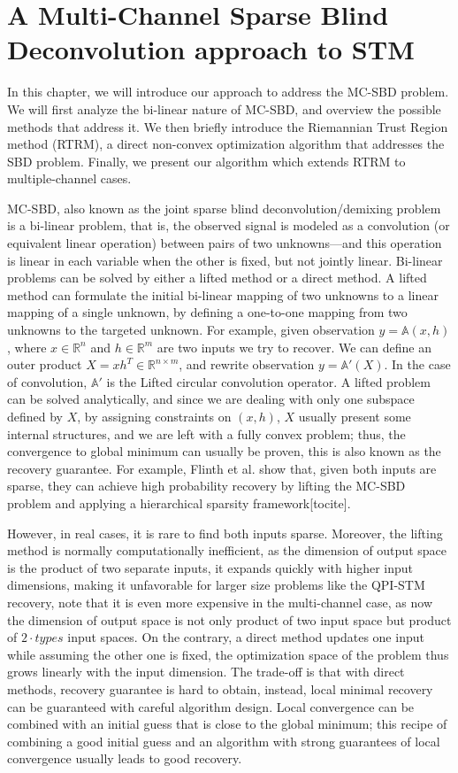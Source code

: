 \section{A Multi-Channel Sparse Blind Deconvolution approach to STM}

In this chapter, we will introduce our approach to address the \ac{MC-SBD} problem. We will first analyze the bi-linear nature of \ac{MC-SBD}, and overview the possible methods that address it. We then briefly introduce the Riemannian Trust Region method (RTRM), a direct non-convex optimization algorithm that addresses the \ac{SBD} problem. Finally, we present our algorithm which extends \ac{RTRM} to multiple-channel cases. 

\ac{MC-SBD}, also known as the joint sparse blind deconvolution/demixing problem is a bi-linear problem, that is, the observed signal is modeled as a convolution (or equivalent linear operation) between pairs of two unknowns—and this operation is linear in each variable when the other is fixed, but not jointly linear. Bi-linear problems can be solved by either a lifted method or a direct method. A lifted method can formulate the initial bi-linear mapping of two unknowns to a linear mapping of a single unknown, by defining a one-to-one mapping from two unknowns to the targeted unknown. For example, given observation $y = \mathbb{A}(x,h)$, where $x \in \mathbb{R}^n$ and $h \in \mathbb{R}^m$ are two inputs we try to recover. We can define an outer product $X = xh^T\in \mathbb{R}^{n\times m}$, and rewrite observation $y = \mathbb{A'}(X)$. In the case of convolution, $\mathbb{A'}$ is the Lifted circular convolution operator. A lifted problem can be solved analytically, and since we are dealing with only one subspace defined by $X$, by assigning constraints on $(x,h)$,  $X$ usually present some internal structures, and we are left with a fully convex problem; thus, the convergence to global minimum can usually be proven, this is also known as the recovery guarantee. For example, Flinth et al. show that, given both inputs are sparse, they can achieve high probability recovery by lifting the \ac{MC-SBD} problem and applying a hierarchical sparsity framework[tocite]. 

However, in real cases, it is rare to find both inputs sparse. Moreover, the lifting method is normally computationally inefficient, as the dimension of output space is the product of two separate inputs, it expands quickly with higher input dimensions, making it unfavorable for larger size problems like the QPI-STM recovery, note that it is even more expensive in the multi-channel case, as now the dimension of output space is not only product of two input space but product of $2 \cdot types$ input spaces. On the contrary, a direct method updates one input while assuming the other one is fixed, the optimization space of the problem thus grows linearly with the input dimension. The trade-off is that with direct methods, recovery guarantee is hard to obtain, instead, local minimal recovery can be guaranteed with careful algorithm design. Local convergence can be combined with an initial guess that is close to the global minimum; this recipe of combining a good initial guess and an algorithm with strong guarantees of local convergence usually leads to good recovery. 

